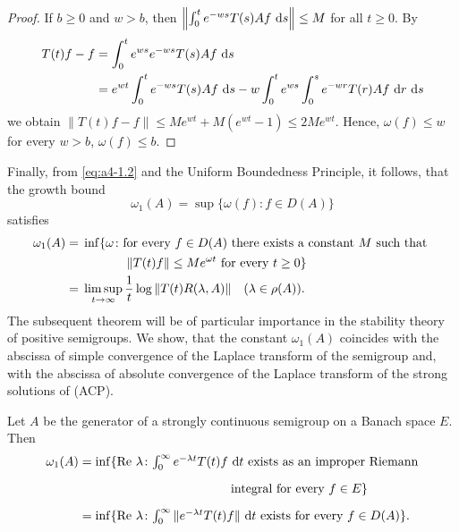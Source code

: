 \begin{proof}
If $b \geq 0$ and $w > b$, then $\left\|\int_{0}^{t} e^{-w s} T(s)Af\,\mathop{}\!\mathrm{d}{s}\right\| \leq M$ for all $t \geq 0$. 
By 
\begin{align*}
T(t)f - f &= \int_{0}^{t} e^{w s} e^{-w s} T(s)Af \,\mathop{}\!\mathrm{d}{s}\\
&= e^{wt}\int_0^t e^{-ws} T(s)Af\,\mathop{}\!\mathrm{d}{s} - w\int_0^te^{ws}\int_0^s e^{-wr} T(r)Af\, \mathop{}\!\mathrm{d}{r}\,\mathop{}\!\mathrm{d}{s}
\end{align*}
we obtain $\|T(t)f-f\| \leq Me^{w t} + M(e^{w t} - 1)
\le 2Me^{wt}$. 
Hence, $\omega(f)\le w$ for every $w > b$, \ie $\omega(f) \leq b$.
\end{proof}
Finally, from \eqref{eq:a4-1.2} and the Uniform Boundedness Principle, it follows, that the growth bound 
%
\[
	\omega_{1}(A) = \sup\{\omega(f) \colon f \in D(A)\}
\]
%
satisfies
\begin{align}
\omega_1(A) &={} \inf \{ \omega \colon \text{for every  $f \in D(A)$  there exists a constant $ M $ such that  }\notag \\
& \phantom{xxxxxxxx} \text{ $\|T(t)f\| \leq Me^{\omega t}$  for every $t \geq 0$} \} \\
&={}
\limsup_{t \to \infty} \frac{1}{t} \log\|T(t)R(\lambda,A)\| \quad (\lambda \in \rho(A)). 
\notag
\end{align}
The subsequent theorem will be of particular importance in the stability theory of positive semigroups.
We show, that the constant $\omega_{1}(A)$ coincides with the abscissa of simple convergence of the Laplace transform of the semigroup and, with the abscissa of absolute convergence of the Laplace transform of the strong solutions of (ACP).
\begin{theorem}\label{thm:a4-1.4}
Let $A$ be the generator of a strongly continuous semigroup on a Banach space $E$. 
Then
\begin{align}\label{eq:a4-1.4}
\omega_{1}(A) &= \inf\{\Re\,\lambda \colon \textstyle{\int_{0}^{\infty} e^{-\lambda t} T(t)f \,\dt} \text{ exists as an improper Riemann} \\
&\phantom{= \inf\{\Re\,\lambda \colon \int_{0}^{\infty} e^{-\lambda t} T(t)f} \text{integral for every } f \in E\} \notag \\
&= \inf\{\Re\,\lambda \colon \textstyle{\int_{0}^{\infty} \|e^{-\lambda t} T(t)f\| \,\dt} \text{ exists for every } f \in D(A)\}.\notag
\end{align}
\end{theorem}

